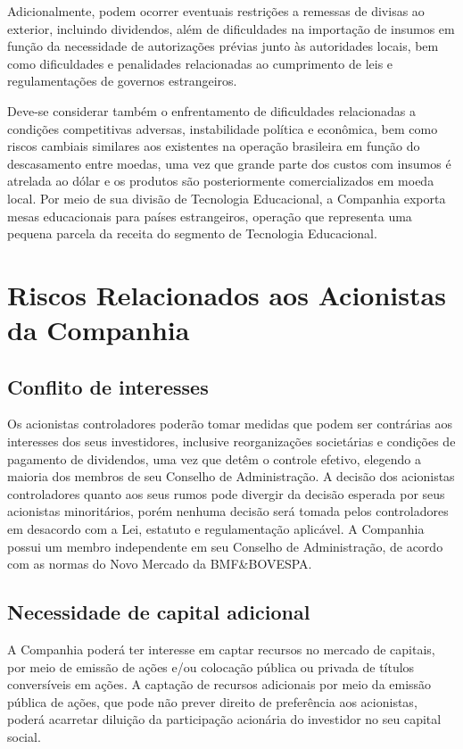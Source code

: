 {{{Adicionalmente, podem ocorrer eventuais restrições a remessas de divisas ao exterior, incluindo dividendos, além de dificuldades na importação de insumos em função da necessidade de autorizações prévias junto às autoridades locais, bem como dificuldades e penalidades relacionadas ao cumprimento de leis e regulamentações de governos estrangeiros.

Deve-se considerar também o enfrentamento de dificuldades relacionadas a condições competitivas adversas, instabilidade política e econômica, bem como riscos cambiais similares aos existentes na operação brasileira em função do descasamento entre moedas, uma vez que grande parte dos custos com insumos é atrelada ao dólar e os produtos são posteriormente comercializados em moeda local. Por meio de sua divisão de Tecnologia Educacional, a Companhia exporta mesas educacionais para países estrangeiros, operação que representa uma pequena parcela da receita do segmento de Tecnologia Educacional. 

\section{Riscos Relacionados aos Acionistas da Companhia}

\subsection{Conflito de interesses}
Os acionistas controladores poderão tomar medidas que podem ser contrárias aos interesses dos seus investidores, inclusive reorganizações societárias e condições de pagamento de dividendos, uma vez que detêm o controle efetivo, elegendo a maioria dos membros de seu Conselho de Administração. A decisão dos acionistas controladores quanto aos seus rumos pode divergir da decisão esperada por seus acionistas minoritários, porém nenhuma decisão será tomada pelos controladores em desacordo com a Lei, estatuto e regulamentação aplicável. A Companhia possui um membro independente em seu Conselho de Administração, de acordo com as normas do Novo Mercado da BMF\&BOVESPA.

\subsection{Necessidade de capital adicional}
A Companhia poderá ter interesse em captar recursos no mercado de capitais, por meio de emissão de ações e/ou colocação pública ou privada de títulos conversíveis em ações. A captação de recursos adicionais por meio da emissão pública de ações, que pode não prever direito de preferência aos acionistas, poderá acarretar diluição da participação acionária do investidor no seu capital social.

}}}
